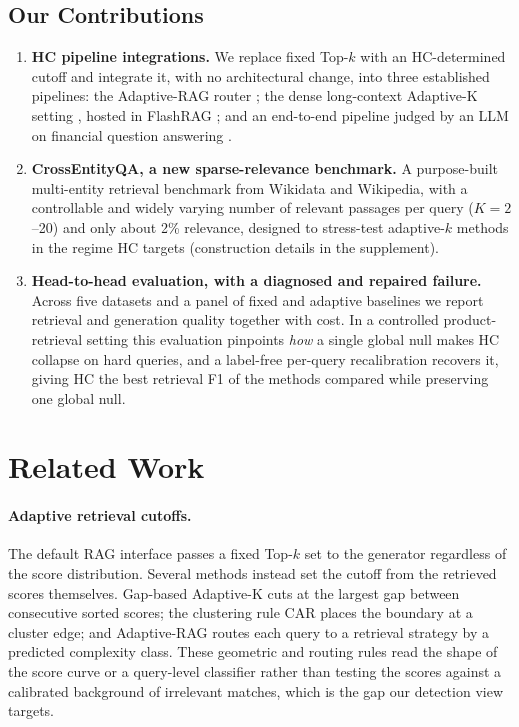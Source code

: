 \documentclass[letterpaper]{article} %
\begin{document}
\subsection{Our Contributions}
\begin{enumerate}[leftmargin=1.4em,itemsep=3pt,topsep=1pt]
\item \textbf{HC pipeline integrations.} We replace fixed Top-$k$ with an
HC-determined cutoff and integrate it, with no architectural change, into
three established pipelines: the Adaptive-RAG router
\citep{jeong2024adaptiverag}; the dense long-context Adaptive-K setting
\citep{adaptivek2025}, hosted in FlashRAG \citep{jin2025flashrag}; and an
end-to-end pipeline judged by an LLM on financial question answering
\citep{thakur2021beir}.

\item \textbf{CrossEntityQA, a new sparse-relevance benchmark.} A
purpose-built multi-entity retrieval benchmark from Wikidata and
Wikipedia, with a controllable and widely varying number of relevant
passages per query ($K{=}2$--20) and only about 2\% relevance, designed
to stress-test adaptive-$k$ methods in the regime HC targets
(construction details in the supplement).

\item \textbf{Head-to-head evaluation, with a diagnosed and repaired
failure.} Across five datasets and a panel of fixed and adaptive
baselines we report retrieval and generation quality together with cost.
In a controlled product-retrieval setting this evaluation pinpoints
\emph{how} a single global null makes HC collapse on hard queries, and a
label-free per-query recalibration recovers it, giving HC the best
retrieval F1 of the methods compared while preserving one global null.
\end{enumerate}

\section{Related Work}
\paragraph{Adaptive retrieval cutoffs.} The default RAG interface
\citep{lewis2020rag} passes a fixed Top-$k$ set to the generator regardless of
the score distribution. Several methods instead set the cutoff from the
retrieved scores themselves. Gap-based Adaptive-K \citep{adaptivek2025} cuts at
the largest gap between consecutive sorted scores; the clustering rule CAR
\citep{xu2025car} places the boundary at a cluster edge; and Adaptive-RAG
\citep{jeong2024adaptiverag} routes each query to a retrieval strategy by a
predicted complexity class. These geometric and routing rules read the shape of
the score curve or a query-level classifier rather than testing the scores
against a calibrated background of irrelevant matches, which is the gap our
detection view targets.
\end{document}
